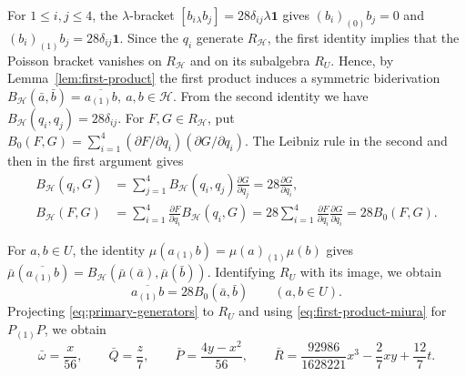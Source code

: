 \documentclass[11pt]{amsart}
\numberwithin{equation}{section}
\theoremstyle{definition}
\theoremstyle{remark}
\newcommand{\one}{\mathbf1}
\begin{document}
For $1\leq i,j\leq4$, the $\lambda$-bracket
$[b_i{}_\lambda b_j]=28\delta_{ij}\lambda\one$ gives
$(b_i)_{(0)}b_j=0$ and $(b_i)_{(1)}b_j=28\delta_{ij}\one$.
Since the $q_i$ generate $R_{\mathcal H}$, the first identity implies that
the Poisson bracket vanishes on $R_{\mathcal H}$ and on its subalgebra $R_U$.
Hence, by Lemma~\ref{lem:first-product} the first product induces a symmetric biderivation $
B_{\mathcal H}(\bar a,\bar b)=\overline{a_{(1)}b},
\ a,b\in\mathcal H.
$ %
From the second identity we have $B_{\mathcal H}(q_i,q_j)=28\delta_{ij}$.
For $F,G\in R_{\mathcal H}$, put
$B_0(F,G)=\sum_{i=1}^4(\partial F/\partial q_i)(\partial G/\partial q_i)$.
The Leibniz rule in the second and then in the first argument gives
\[
\begin{aligned}
 B_{\mathcal H}(q_i,G)
 &=\sum_{j=1}^4 B_{\mathcal H}(q_i,q_j)\frac{\partial G}{\partial q_j}
   =28\frac{\partial G}{\partial q_i},\\
 B_{\mathcal H}(F,G)
 &=\sum_{i=1}^4\frac{\partial F}{\partial q_i}B_{\mathcal H}(q_i,G)
   =28\sum_{i=1}^4\frac{\partial F}{\partial q_i}
                    \frac{\partial G}{\partial q_i}=28B_0(F,G).
\end{aligned}
\]

For $a,b\in U$, the identity $\mu(a_{(1)}b)=\mu(a)_{(1)}\mu(b)$ gives
$\bar\mu(\overline{a_{(1)}b})=
B_{\mathcal H}(\bar\mu(\bar a),\bar\mu(\bar b))$.
Identifying $R_U$ with its image, we obtain
\begin{equation}\label{eq:first-product-miura}
 \overline{a_{(1)}b}=28B_0(\bar a,\bar b)\qquad(a,b\in U).
\end{equation}
Projecting \eqref{eq:primary-generators} to $R_U$ and using
\eqref{eq:first-product-miura} for $P_{(1)}P$, we obtain
\[
 \bar\omega=\frac{x}{56},\qquad
 \bar Q=\frac z7,\qquad
 \bar P=\frac{4y-x^2}{56},\qquad
 \bar R=\frac{92986}{1628221}x^3-\frac27xy+\frac{12}{7}t.
\]

\end{document}
